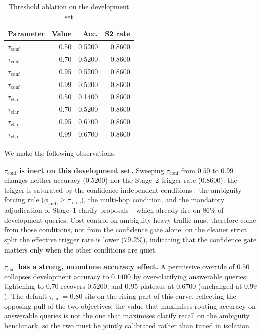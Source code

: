 \documentclass[pdflatex,sn-mathphys-num]{sn-jnl}
\begin{document}
\begin{table}[!htbp]
\centering
\caption{Threshold ablation on the development set}\label{tab:threshold_ablation}
\begin{tabular}{lrrr}
\toprule
\textbf{Parameter} & \textbf{Value} & \textbf{Acc.} & \textbf{S2 rate} \\
\midrule
$\tau_{\mathrm{conf}}$ & 0.50 & 0.5200 & 0.8600 \\
$\tau_{\mathrm{conf}}$ & 0.70 & 0.5200 & 0.8600 \\
$\tau_{\mathrm{conf}}$ & 0.95 & 0.5200 & 0.8600 \\
$\tau_{\mathrm{conf}}$ & 0.99 & 0.5200 & 0.8600 \\
\midrule
$\tau_{\mathrm{clar}}$ & 0.50 & 0.1400 & 0.8600 \\
$\tau_{\mathrm{clar}}$ & 0.70 & 0.5200 & 0.8600 \\
$\tau_{\mathrm{clar}}$ & 0.95 & 0.6700 & 0.8600 \\
$\tau_{\mathrm{clar}}$ & 0.99 & 0.6700 & 0.8600 \\
\bottomrule
\end{tabular}
\end{table}

We make the following observations.

\noindent\textbf{$\tau_{\mathrm{conf}}$ is inert on this development set.}
Sweeping $\tau_{\mathrm{conf}}$ from $0.50$ to $0.99$ changes neither
accuracy ($0.5200$) nor the Stage~2 trigger rate ($0.8600$): the trigger is
saturated by the confidence-independent conditions---the ambiguity forcing
rule ($\phi_{\mathrm{amb}}\ge\tau_{\mathrm{force}}$), the multi-hop
condition, and the mandatory adjudication of Stage~1 clarify
proposals---which already fire on $86\%$ of development queries. Cost
control on ambiguity-heavy traffic must therefore come from those
conditions, not from the confidence gate alone; on the cleaner strict split
the effective trigger rate is lower ($79.2\%$), indicating that the
confidence gate matters only when the other conditions are quiet.

\noindent\textbf{$\tau_{\mathrm{clar}}$ has a strong, monotone accuracy
effect.} A permissive override of $0.50$ collapses development accuracy to
$0.1400$ by over-clarifying answerable queries; tightening to $0.70$ recovers
$0.5200$, and $0.95$ plateaus at $0.6700$ (unchanged at $0.99$). The default
$\tau_{\mathrm{clar}}=0.80$ sits on the rising part of this curve,
reflecting the opposing pull of the two objectives: the value that maximises
routing accuracy on answerable queries is not the one that maximises clarify
recall on the ambiguity benchmark, so the two must be jointly calibrated
rather than tuned in isolation.
\end{document}

